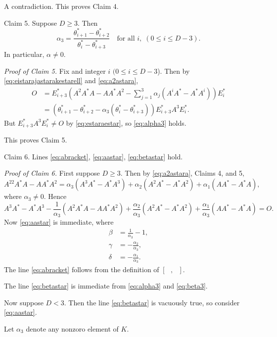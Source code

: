 \documentclass[
]{book}
\theoremstyle{definition}
\theoremstyle{definition}
\theoremstyle{definition}
\theoremstyle{definition}
\theoremstyle{remark}
\begin{document}
A contradiction. This proves Claim 4.

Claim 5. Suppose \(D\geq 3\). Then
\begin{equation}
\alpha_3 = \frac{\theta^*_{i+1}-\theta^*_{i+2}}{\theta^*_i - \theta^*_{i+3}} \quad \text{for all }i, \; (0\leq i\leq D-3). \label{eq:alpha3}
\end{equation}
In particular, \(\alpha\neq 0\).

\emph{Proof of Claim 5.}
Fix and integer \(i\) \((0\leq i\leq D-3\)). Then
by \eqref{eq:eistarajastarakestarell} and \eqref{eq:a2astara},
\begin{align}
O & = E^*_{i+3}\left(A^2A^*A - AA^*A^2 - \sum_{j=1}^3\alpha_j(A^iA^*-A^*A^i)\right)E^*_i\\
& = (\theta^*_{i+1}-\theta^*_{i+2}-\alpha_3(\theta^*_i-\theta^*_{i+3}))E^*_{i+3}A^3E^*_i.
\end{align}
But \(E^*_{i+3}A^3E^*_i\neq O\) by \eqref{eq:estaraestar}, so \eqref{eq:alpha3} holds.

This proves Claim 5.

Claim 6. Lines \eqref{eq:abracket}, \eqref{eq:aastar}, \eqref{eq:betastar} hold.

\emph{Proof of Claim 6.}
First suppose \(D\geq 3\). Then by \eqref{eq:a2astara}, Claims 4, and 5,
\begin{equation}
A^22A^*A-AA^*A^2 = \alpha_3(A^3A^*-A^*A^3)+\alpha_2(A^2A^*-A^*A^2) + \alpha_1(AA^*-A^*A), \label{eq:a2astara3}
\end{equation}
where \(\alpha_3\neq 0\). Hence
\[A^3A^*-A^*A^3-\frac{1}{\alpha_3}(A^2A^*A-AA^*A^2)+\frac{\alpha_2}{\alpha_3}(A^2A^*-A^*A^2)+
\frac{\alpha_1}{\alpha_3}(AA^*-A^*A)=O.\]
Now \eqref{eq:aastar} is immediate, where
\begin{align}
\beta & = \frac{1}{\alpha_3}-1, \label{eq:beta3}\\
\gamma & = -\frac{\alpha_2}{\alpha_3}, \label{eq:gamma3}\\
\delta & = -\frac{\alpha_1}{\alpha_3}. \label{eq:delta3}
\end{align}
The line \eqref{eq:abracket} follows from the definition of \([\text{ }, \text{ }]\).

The line \eqref{eq:betastar} is immediate from \eqref{eq:alpha3} and \eqref{eq:beta3}.

Now suppose \(D < 3\). Then the line \eqref{eq:betastar} is vacuously true, so consider \eqref{eq:aastar}.

Let \(\alpha_3\) denote any nonzoro element of \(K\).
\end{document}
